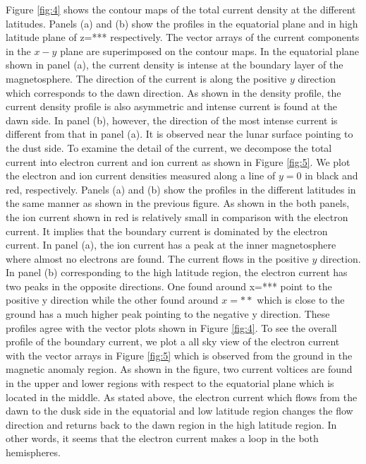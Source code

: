 \documentclass{EPS}
\begin{document}
Figure \ref{fig:4} shows the contour maps of the total current density at the different latitudes. 
Panels (a) and (b) show the profiles in the equatorial plane and in high latitude plane of z=*** respectively. 
The vector arrays of the current components in the $x-y$ plane are superimposed on the contour maps. 
In the equatorial plane shown in panel (a), 
the current density is intense at the boundary layer of the magnetosphere. 
The direction of the current is along the positive $y$ direction which corresponds to the dawn direction. 
As shown in the density profile, the current density profile is also asymmetric and 
intense current is found at the dawn side. 
In panel (b), however, the direction of the most intense current is different from that in panel (a). 
It is observed near the lunar surface pointing to the dust side. 
To examine the detail of the current, we decompose the total current into electron current and 
ion current as shown in Figure \ref{fig:5}. 
We plot the electron and ion current densities measured along a line of $y=0$ in black and red, respectively. 
Panels (a) and (b) show the profiles in the different latitudes in the same manner as shown in the previous figure. 
As shown in the both panels, the ion current shown in red is relatively small in comparison with the electron current. 
It implies that the boundary current is dominated by the electron current. 
In panel (a), the ion current has a peak at the inner magnetosphere where almost no electrons are found. 
The current flows in the positive $y$ direction. In panel (b) corresponding to the high latitude region, 
the electron current has two peaks in the opposite directions. 
One found around x=*** point to the positive y direction while the other found around $x=**$ 
which is close to the ground has a much higher peak pointing to the negative y direction. 
These profiles agree with the vector plots shown in Figure \ref{fig:4}. 
To see the overall profile of the boundary current, 
we plot a all sky view of the electron current with the vector arrays in Figure \ref{fig:5} 
which is observed from the ground in the magnetic anomaly region. 
As shown in the figure, 
two current voltices are found in the upper and lower regions 
with respect to the equatorial plane which is located in the middle.
As stated above, 
the electron current which flows from the dawn to the dusk side in the equatorial and low latitude region
changes the flow direction and returns back to the dawn region in the high latitude region.
In other words, it seems that the electron current makes a loop in the both hemispheres. 
\end{document}
